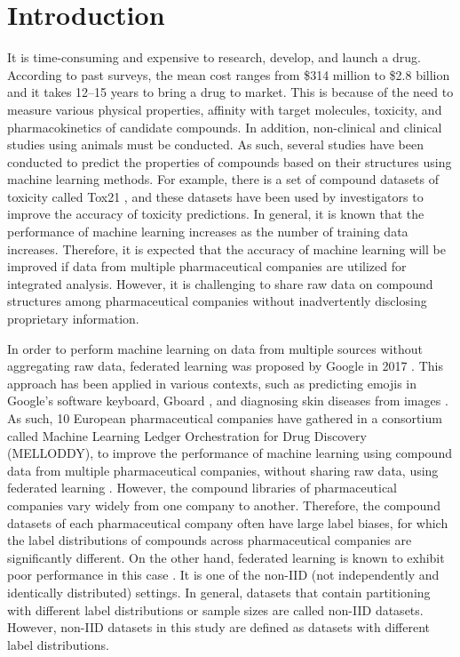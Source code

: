 \documentclass{article}
\begin{document}
\section{Introduction}
\label{sec:introduction}
It is time-consuming and expensive to research, develop, and launch a drug. According to past surveys, the mean cost ranges from \$314 million to \$2.8 billion \cite{wouters2020estimated} and it takes 12–15 years \cite{hughes2011principles} to bring a drug to market. This is because of the need to measure various physical properties, affinity with target molecules, toxicity, and pharmacokinetics of candidate compounds. In addition, non-clinical and clinical studies using animals must be conducted. As such, several studies have been conducted to predict the properties of compounds based on their structures using machine learning methods. For example, there is a set of compound datasets of toxicity called Tox21 \cite{mayr2016deeptox}, and these datasets have been used by investigators to improve the accuracy of toxicity predictions. In general, it is known that the performance of machine learning increases as the number of training data increases. Therefore, it is expected that the accuracy of machine learning will be improved if data from multiple pharmaceutical companies are utilized for integrated analysis. However, it is challenging to share raw data on compound structures among pharmaceutical companies without inadvertently disclosing proprietary information.

In order to perform machine learning on data from multiple sources without aggregating raw data, federated learning was proposed by Google in 2017 \cite{konevcny2016federated}. This approach has been applied in various contexts, such as predicting emojis in Google's software keyboard, Gboard \cite{hard2018federated}, and diagnosing skin diseases from images \cite{hossen2022federated}. As such, 10 European pharmaceutical companies have gathered in a consortium called Machine Learning Ledger Orchestration for Drug Discovery (MELLODDY), to improve the performance of machine learning using compound data from multiple pharmaceutical companies, without sharing raw data, using federated learning \cite{burki2019pharma}. However, the compound libraries of pharmaceutical companies vary widely from one company to another. Therefore, the compound datasets of each pharmaceutical company often have large label biases, for which the label distributions of compounds across pharmaceutical companies are significantly different. On the other hand, federated learning is known to exhibit poor performance in this case \cite{zhao2018federated}. It is one of the non-IID (not independently and identically distributed) settings. In general, datasets that contain partitioning with different label distributions or sample sizes are called non-IID datasets. However, non-IID datasets in this study are defined as datasets with different label distributions. 
\end{document}
